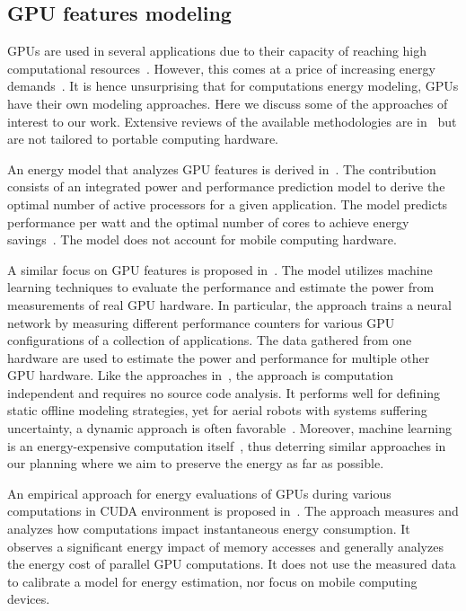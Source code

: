 \subsection{GPU features modeling}

GPUs are used in several applications due to their capacity of reaching high computational resources~\citep{kasichayanula2012power}. However, this comes at a price of increasing energy demands~\citep{mittal2014survey}. It is hence unsurprising that for computations energy modeling, GPUs have their own modeling approaches. Here we discuss some of the approaches of interest to our work. Extensive reviews of the available methodologies are in~\citep{mittal2014survey,bridges2016understanding} but are not tailored to portable computing hardware.

An energy model that analyzes GPU features is derived in~\citep{hong2010integrated}. The contribution consists of an integrated power and performance prediction model to derive the optimal number of active processors for a given application. The model predicts performance per watt and the optimal number of cores to achieve energy savings~\citep{hong2010integrated}. The model does not account for mobile computing hardware.

A similar focus on GPU features is proposed in~\citep{wu2015gpgpu}.  The model utilizes machine learning techniques to evaluate the performance and estimate the power from measurements of real GPU hardware. In particular, the approach trains a neural network by measuring different performance counters for various GPU configurations of a collection of applications. The data gathered from one hardware are used to estimate the power and performance for multiple other GPU hardware. Like the approaches in~, the approach is computation independent and requires no source code analysis. It performs well for defining static offline modeling strategies, yet for aerial robots with systems suffering uncertainty, a dynamic approach is often favorable~\citep{seewald2019coarse}. Moreover, machine learning is an energy-expensive computation itself~\citep{garcia2019estimation,yang2017method}, thus deterring similar approaches in our planning where we aim to preserve the energy as far as possible.

An empirical approach for energy evaluations of GPUs during various computations in CUDA environment is proposed in~\citep{collange2009power}. The approach measures and analyzes how computations impact instantaneous energy consumption. It observes a significant energy impact of memory accesses and generally analyzes the energy cost of parallel GPU computations. It does not use the measured data to calibrate a model for energy estimation, nor focus on mobile computing devices.

